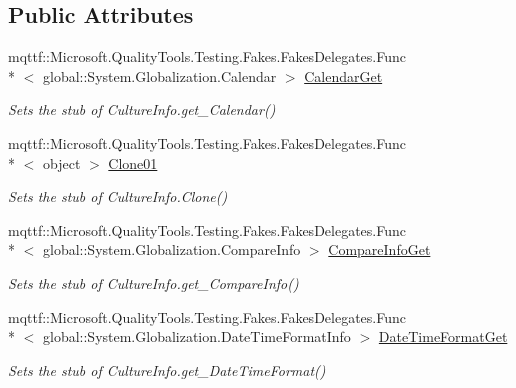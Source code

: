 \subsection*{Public Attributes}
\begin{DoxyCompactItemize}
\item 
mqttf\-::\-Microsoft.\-Quality\-Tools.\-Testing.\-Fakes.\-Fakes\-Delegates.\-Func\\*
$<$ global\-::\-System.\-Globalization.\-Calendar $>$ \hyperlink{class_system_1_1_globalization_1_1_fakes_1_1_stub_culture_info_a78f57328e4ba480f03d9d9642dbb22d4}{Calendar\-Get}
\begin{DoxyCompactList}\small\item\em Sets the stub of Culture\-Info.\-get\-\_\-\-Calendar()\end{DoxyCompactList}\item 
mqttf\-::\-Microsoft.\-Quality\-Tools.\-Testing.\-Fakes.\-Fakes\-Delegates.\-Func\\*
$<$ object $>$ \hyperlink{class_system_1_1_globalization_1_1_fakes_1_1_stub_culture_info_ab15f2a25521d963e77dfddb273a06862}{Clone01}
\begin{DoxyCompactList}\small\item\em Sets the stub of Culture\-Info.\-Clone()\end{DoxyCompactList}\item 
mqttf\-::\-Microsoft.\-Quality\-Tools.\-Testing.\-Fakes.\-Fakes\-Delegates.\-Func\\*
$<$ global\-::\-System.\-Globalization.\-Compare\-Info $>$ \hyperlink{class_system_1_1_globalization_1_1_fakes_1_1_stub_culture_info_ad4418eef257c9465449a8dc2b6a950ed}{Compare\-Info\-Get}
\begin{DoxyCompactList}\small\item\em Sets the stub of Culture\-Info.\-get\-\_\-\-Compare\-Info()\end{DoxyCompactList}\item 
mqttf\-::\-Microsoft.\-Quality\-Tools.\-Testing.\-Fakes.\-Fakes\-Delegates.\-Func\\*
$<$ global\-::\-System.\-Globalization.\-Date\-Time\-Format\-Info $>$ \hyperlink{class_system_1_1_globalization_1_1_fakes_1_1_stub_culture_info_a19262fe1d066da93657534b3887f7b95}{Date\-Time\-Format\-Get}
\begin{DoxyCompactList}\small\item\em Sets the stub of Culture\-Info.\-get\-\_\-\-Date\-Time\-Format()\end{DoxyCompactList}\item 

\end{DoxyCompactItemize}
